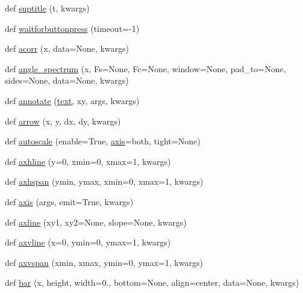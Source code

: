 \begin{DoxyCompactItemize}
\item 
def \hyperlink{namespacematplotlib_1_1pyplot_ae29fdb1bf2fa4ad83ef5fb0fb6fbf058}{suptitle} (t, kwargs)
\item 
def \hyperlink{namespacematplotlib_1_1pyplot_a6b887bdfd9777b1600af5c25e6c49b0d}{waitforbuttonpress} (timeout=-\/1)
\item 
def \hyperlink{namespacematplotlib_1_1pyplot_ae79eb543dcc7c85935642a758ecfec4a}{acorr} (x, data=None, kwargs)
\item 
def \hyperlink{namespacematplotlib_1_1pyplot_ad8a8bef6e5dd83840e72cb8f6df43104}{angle\+\_\+spectrum} (x, Fs=None, Fc=None, window=None, pad\+\_\+to=None, sides=None, data=None, kwargs)
\item 
def \hyperlink{namespacematplotlib_1_1pyplot_a3c57735562857fc6b0e39bf090b8e8ff}{annotate} (\hyperlink{namespacematplotlib_1_1pyplot_a88aae7706a5442308884b8726d64a505}{text}, xy, args, kwargs)
\item 
def \hyperlink{namespacematplotlib_1_1pyplot_a265ecaf792cced19e2fd03939cdf2dba}{arrow} (x, y, dx, dy, kwargs)
\item 
def \hyperlink{namespacematplotlib_1_1pyplot_a0901c2890ad4ba4aa1da22393a7ade14}{autoscale} (enable=True, \hyperlink{namespacematplotlib_1_1pyplot_a491a6aa585ceb1955264031156654647}{axis}=\textquotesingle{}both\textquotesingle{}, tight=None)
\item 
def \hyperlink{namespacematplotlib_1_1pyplot_ae1c703faf09edbb310c1689ee4569c8c}{axhline} (y=0, xmin=0, xmax=1, kwargs)
\item 
def \hyperlink{namespacematplotlib_1_1pyplot_af110601f76ada099dc4b0dfdb8312d81}{axhspan} (ymin, ymax, xmin=0, xmax=1, kwargs)
\item 
def \hyperlink{namespacematplotlib_1_1pyplot_a491a6aa585ceb1955264031156654647}{axis} (args, emit=True, kwargs)
\item 
def \hyperlink{namespacematplotlib_1_1pyplot_a0482c59aad018dea18535a2cd934fce4}{axline} (xy1, xy2=None, slope=None, kwargs)
\item 
def \hyperlink{namespacematplotlib_1_1pyplot_a843009c72c87d84f60c0701f2548dde9}{axvline} (x=0, ymin=0, ymax=1, kwargs)
\item 
def \hyperlink{namespacematplotlib_1_1pyplot_abc33bd7c4ef7fd70c958c611238841bc}{axvspan} (xmin, xmax, ymin=0, ymax=1, kwargs)
\item 
def \hyperlink{namespacematplotlib_1_1pyplot_ad38194863cb71209db712be324411404}{bar} (x, height, width=0., bottom=None, align=\textquotesingle{}center\textquotesingle{}, data=None, kwargs)

\end{DoxyCompactItemize}
